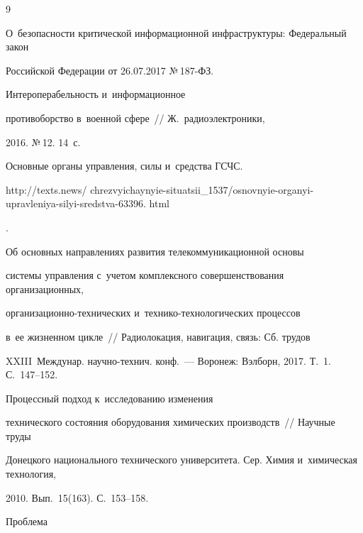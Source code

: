 {\small\frenchspacing

{%


\begin{thebibliography}{9}



\vspace*{-2pt}


О~безопасности критической информационной инфраструктуры: Федеральный закон 

Российской Федерации от 26.07.2017 №\,187-ФЗ. 


 Интероперабельность и~информационное 

противоборство в~военной сфере~/\!\!/ Ж.~радиоэлектроники, 

2016. №\,12. 14~с.


Основные органы управления, силы и~средства ГСЧС. {\sf  

http://texts.news/ chrezvyichaynyie-situatsii\_1537/osnovnyie-organyi-upravleniya-silyi-sredstva-63396. html}.


 Об основных направлениях развития телекоммуникационной основы 

системы управления с~учетом комплексного совершенствования организационных,  

ор\-га\-ни\-за\-ци\-он\-но-тех\-ни\-че\-ских и~тех\-ни\-ко-тех\-но\-ло\-ги\-че\-ских процессов 

в~ее жизненном цикле~/\!\!/ Радиолокация, навигация, связь: Сб. трудов 

XXIII~Междунар. научно-технич. конф.~--- Воронеж: Вэлборн, 2017. Т.~1. С.~147--152. 


 Процессный подход к~исследованию изменения 

технического состояния оборудования химических производств~/\!\!/ Научные труды 

Донецкого национального технического университета. Сер. Химия и~химическая технология, 

2010. Вып.~15(163). С.~153--158.


 Проблема 


\end{thebibliography}}}

